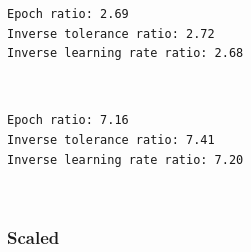 \documentclass[a4paper,landscape]{article}
\begin{document}
    \begin{Verbatim}[commandchars=\\\{\}]
Epoch ratio: 2.69
Inverse tolerance ratio: 2.72
Inverse learning rate ratio: 2.68
    \end{Verbatim}

    \begin{center}
    \end{center}
    { \hspace*{\fill} \\}
    
    \begin{Verbatim}[commandchars=\\\{\}]
Epoch ratio: 7.16
Inverse tolerance ratio: 7.41
Inverse learning rate ratio: 7.20
    \end{Verbatim}

    \begin{center}
    \end{center}
    { \hspace*{\fill} \\}
    
    \subsubsection{Scaled}\label{scaled}
\end{document}
